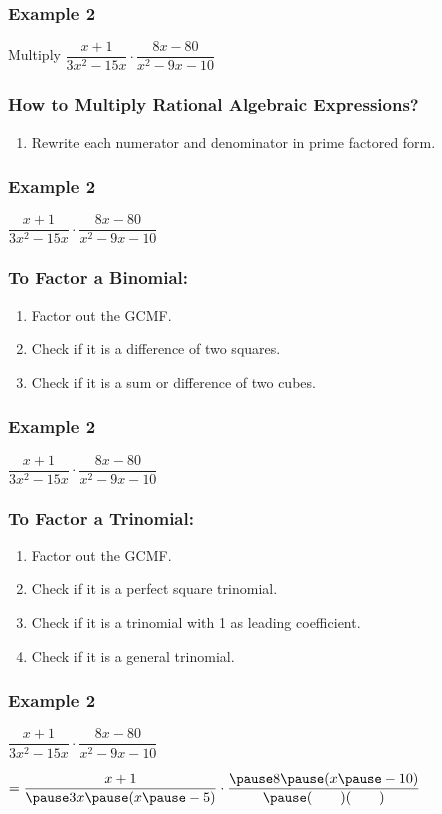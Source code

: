 \documentclass[14pt]{beamer}
\begin{document}
    \begin{frame}
    	\frametitle{Example 2}
    	Multiply $\dfrac{x + 1}{3x^2 - 15x} \cdot \dfrac{8x -80}{x^2 - 9x - 10}$
    \end{frame}

    \begin{frame}
    	\frametitle{How to Multiply Rational Algebraic Expressions?}
    	\begin{enumerate}
    		\item Rewrite each numerator and denominator in prime factored form.
    	\end{enumerate}
    \end{frame}

     \begin{frame}
    	\frametitle{Example 2}
    	$\dfrac{x + 1}{3x^2 - 15x} \cdot \dfrac{8x -80}{x^2 - 9x - 10}$
    \end{frame}

    \begin{frame}
    	\frametitle{To Factor a Binomial:}
    	\begin{enumerate}
    		\item<1-> Factor out the GCMF.
    		\item<2-> Check if it is a difference of two squares.
    		\item<3-> Check if it is a sum or difference of two cubes.
    	\end{enumerate}
    \end{frame}

    \begin{frame}
    	\frametitle{Example 2}
    	$\dfrac{x + 1}{3x^2 - 15x} \cdot \dfrac{8x -80}{x^2 - 9x - 10}$
    \end{frame}
    
    \begin{frame}
    	\frametitle{To Factor a Trinomial:}
    	\begin{enumerate}
    		\item<1-> Factor out the GCMF.
    		\item<2-> Check if it is a perfect square trinomial.
    		\item<3-> Check if it is a trinomial with 1 as leading coefficient.
    		\item<4-> Check if it is a general trinomial.
    	\end{enumerate}
    \end{frame}

     \begin{frame}
    	\frametitle{Example 2}
    		$\dfrac{x + 1}{3x^2 - 15x} \cdot \dfrac{8x -80}{x^2 - 9x - 10}$ 
    		
    		\pause \vspace{1em} $= \dfrac{x + 1}{\pause 3x \pause (x \pause -5)} \cdot \dfrac{\pause 8 \pause (x \pause -10)}{\pause (\void)(\void)}$
    \end{frame}
\end{document}
